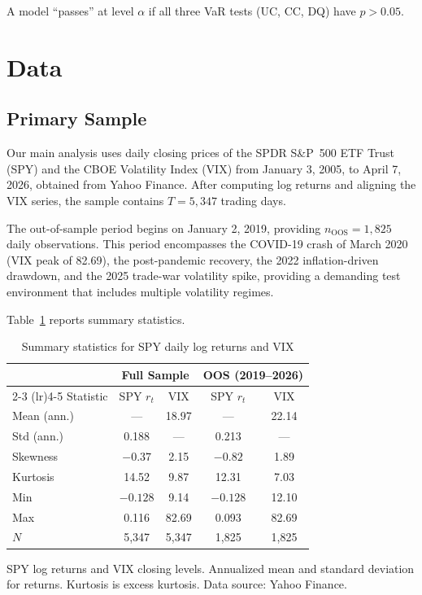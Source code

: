 \documentclass[12pt,a4paper]{article}
\begin{document}
A model ``passes'' at level $\alpha$ if all three VaR tests (UC, CC, DQ) have $p > 0.05$.


\section{Data}
\label{sec:data}

\subsection{Primary Sample}

Our main analysis uses daily closing prices of the SPDR S\&P~500 ETF Trust (SPY) and the CBOE Volatility Index (VIX) from January 3, 2005, to April 7, 2026, obtained from Yahoo Finance. After computing log returns and aligning the VIX series, the sample contains $T = 5{,}347$ trading days.

The out-of-sample period begins on January 2, 2019, providing $n_{\text{OOS}} = 1{,}825$ daily observations. This period encompasses the COVID-19 crash of March 2020 (VIX peak of 82.69), the post-pandemic recovery, the 2022 inflation-driven drawdown, and the 2025 trade-war volatility spike, providing a demanding test environment that includes multiple volatility regimes.

Table~\ref{tab:summary_stats} reports summary statistics.

\begin{table}[H]
\centering
\caption{Summary statistics for SPY daily log returns and VIX}
\label{tab:summary_stats}
\begin{threeparttable}
\begin{tabular}{@{}lcccc@{}}
\toprule
& \multicolumn{2}{c}{Full Sample} & \multicolumn{2}{c}{OOS (2019--2026)} \\
\cmidrule(lr){2-3} \cmidrule(lr){4-5}
Statistic & SPY $r_t$ & VIX & SPY $r_t$ & VIX \\
\midrule
Mean (ann.) & --- & 18.97 & --- & 22.14 \\
Std (ann.)  & 0.188 & --- & 0.213 & --- \\
Skewness    & $-0.37$ & 2.15 & $-0.82$ & 1.89 \\
Kurtosis    & 14.52 & 9.87 & 12.31 & 7.03 \\
Min         & $-0.128$ & 9.14 & $-0.128$ & 12.10 \\
Max         & 0.116 & 82.69 & 0.093 & 82.69 \\
$N$         & 5,347 & 5,347 & 1,825 & 1,825 \\
\bottomrule
\end{tabular}
\begin{tablenotes}
\footnotesize
\item SPY log returns and VIX closing levels. Annualized mean and standard deviation for returns. Kurtosis is excess kurtosis. Data source: Yahoo Finance.
\end{tablenotes}
\end{threeparttable}
\end{table}
\end{document}
